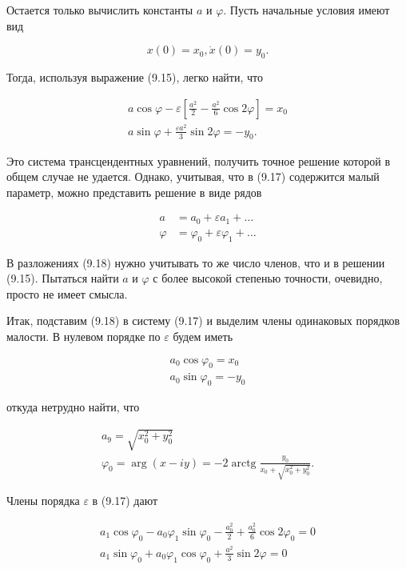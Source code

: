 \documentclass[10pt]{article}
\begin{document}
Остается только вычислить константы $a$ и $\varphi$. Пусть начальные условия имеют вид


\begin{equation*}
x(0)=x_{0}, \dot{x}(0)=y_{0} . \tag{9.16}
\end{equation*}


Тогда, используя выражение (9.15), легко найти, что


\begin{gather*}
a \cos \varphi-\varepsilon\left[\frac{a^{2}}{2}-\frac{a^{2}}{6} \cos 2 \varphi\right]=x_{0}  \tag{9.17}\\
a \sin \varphi+\frac{\varepsilon a^{2}}{3} \sin 2 \varphi=-y_{0} .
\end{gather*}


Это система трансцендентных уравнений, получить точное решение которой в общем случае не удается. Однако, учитывая, что в (9.17) содержится малый параметр, можно представить решение в виде рядов


\begin{align*}
a & =a_{0}+\varepsilon a_{1}+\ldots \\
\varphi & =\varphi_{0}+\varepsilon \varphi_{1}+\ldots \tag{9.18}
\end{align*}


В разложениях (9.18) нужно учитывать то же число членов, что и в решении (9.15). Пытаться найти $a$ и $\varphi$ с более высокой степенью точности, очевидно, просто не имеет смысла.

Итак, подставим (9.18) в систему (9.17) и выделим члены одинаковых порядков малости. В нулевом порядке по $\varepsilon$ будем иметь


\begin{gather*}
a_{0} \cos \varphi_{0}=x_{0}  \tag{9.19}\\
a_{0} \sin \varphi_{0}=-y_{0}
\end{gather*}


откуда нетрудно найти, что


\begin{gather*}
a_{9}=\sqrt{x_{0}^{2}+y_{0}^{2}} \\
\varphi_{0}=\arg (x-i y)=-2 \operatorname{arctg} \frac{y_{0}}{x_{0}+\sqrt{x_{0}^{2}+y_{0}^{2}}} . \tag{9.20}
\end{gather*}


Члены порядка $\varepsilon$ в (9.17) дают


\begin{gather*}
a_{1} \cos \varphi_{0}-a_{0} \varphi_{1} \sin \varphi_{0}-\frac{a_{0}^{2}}{2}+\frac{a_{0}^{2}}{6} \cos 2 \varphi_{0}=0  \tag{9.21}\\
a_{1} \sin \varphi_{0}+a_{0} \varphi_{1} \cos \varphi_{0}+\frac{a^{2}}{3} \sin 2 \varphi=0
\end{gather*}
\end{document}
